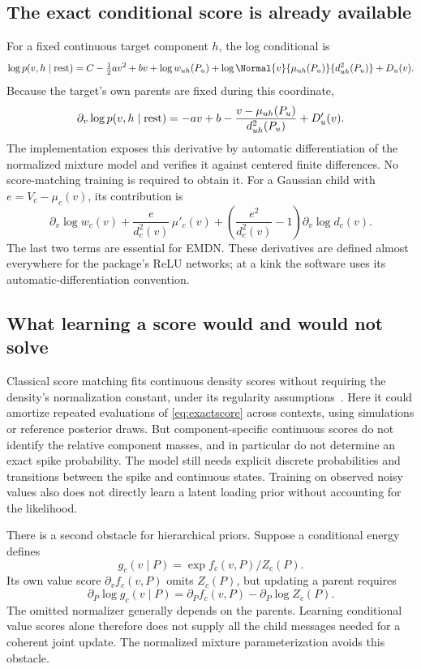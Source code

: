\subsection{The exact conditional score is already available}
For a fixed continuous target component \(h\), the log conditional is
\[
\log p(v,h\mid{\rm rest})=C-\tfrac12av^2+bv
+\log w_{uh}(P_u)+\log\Normal{v}{\mu_{uh}(P_u)}{d_{uh}^2(P_u)}
+D_u(v).
\]
Because the target's own parents are fixed during this coordinate,
\begin{equation}
\partial_v\log p(v,h\mid{\rm rest})
=-av+b-\frac{v-\mu_{uh}(P_u)}{d_{uh}^2(P_u)}
+D'_u(v).
\label{eq:exactscore}
\end{equation}
The implementation exposes this derivative by automatic differentiation
of the normalized mixture model and verifies it against centered finite
differences. No score-matching training is required to obtain it.
For a Gaussian child with \(e=V_c-\mu_c(v)\), its contribution is
\begin{equation}
\partial_v\log w_c(v)
+\frac{e}{d_c^2(v)}\,\mu'_c(v)
+\left(\frac{e^2}{d_c^2(v)}-1\right)
   \partial_v\log d_c(v).
\label{eq:childscore}
\end{equation}
The last two terms are essential for EMDN. These derivatives are defined
almost everywhere for the package's ReLU networks; at a kink the software
uses its automatic-differentiation convention.

\subsection{What learning a score would and would not solve}
Classical score matching fits continuous density scores without requiring
the density's normalization constant, under its regularity
assumptions~\cite{hyvarinen}. Here it could amortize repeated evaluations
of \eqref{eq:exactscore} across contexts, using simulations or reference
posterior draws. But component-specific continuous scores do not identify
the relative component masses, and in particular do not determine an
exact spike probability. The model still needs explicit discrete
probabilities and transitions between the spike and continuous states.
Training on observed noisy values also does not directly learn a latent
loading prior without accounting for the likelihood.

There is a second obstacle for hierarchical priors. Suppose a conditional
energy defines
\[
g_c(v\mid P)=\exp f_c(v,P)/Z_c(P).
\]
Its own value score \(\partial_v f_c(v,P)\) omits \(Z_c(P)\), but updating
a parent requires
\[
\partial_P\log g_c(v\mid P)
=\partial_P f_c(v,P)-\partial_P\log Z_c(P).
\]
The omitted normalizer generally depends on the parents. Learning
conditional value scores alone therefore does not supply all the
child messages needed for a coherent joint update. The normalized
mixture parameterization avoids this obstacle.

